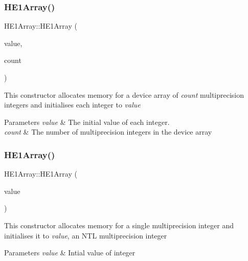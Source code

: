 \subsubsection{\texorpdfstring{H\+E1\+Array()}{HE1Array()}\hspace{0.1cm}{\footnotesize\ttfamily [2/6]}}
{\footnotesize\ttfamily H\+E1\+Array\+::\+H\+E1\+Array (\begin{DoxyParamCaption}\item[{int}]{value,  }\item[{unsigned int}]{count }\end{DoxyParamCaption})}

This constructor allocates memory for a device array of {\itshape count} multiprecision integers and initialises each integer to {\itshape value} 
\begin{DoxyParams}{Parameters}
{\em value} & The initial value of each integer. \\
\hline
{\em count} & The number of multiprecision integers in the device array \\
\hline
\end{DoxyParams}
\mbox{\label{classHE1Array_af000ef4656e6b1136b9aaec07e683ad0}} 
\subsubsection{\texorpdfstring{H\+E1\+Array()}{HE1Array()}\hspace{0.1cm}{\footnotesize\ttfamily [3/6]}}
{\footnotesize\ttfamily H\+E1\+Array\+::\+H\+E1\+Array (\begin{DoxyParamCaption}\item[{N\+T\+L\+::\+ZZ \&}]{value }\end{DoxyParamCaption})}

This constructor allocates memory for a single multiprecision integer and initialises it to {\itshape value}, an N\+TL multiprecision integer 
\begin{DoxyParams}{Parameters}
{\em value} & Intial value of integer \\
\hline
\end{DoxyParams}
\mbox{\label{classHE1Array_aa2bc58501546488b6d05b7f14b2f8ec3}} 
